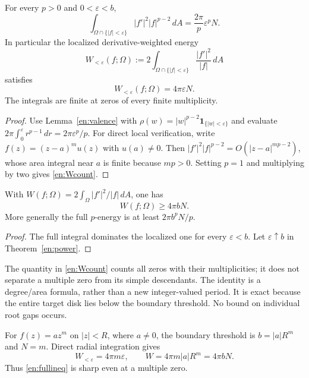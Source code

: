 \begin{theorem}\label{en:power}
For every $p>0$ and $0<\varepsilon<b$,
\begin{equation}\label{en:poweridentity}
 \int_{\Omega\cap\{|f|<\varepsilon\}}
       |f'|^2|f|^{p-2}\,dA
 =\frac{2\pi}{p}\varepsilon^p N.
\end{equation}
In particular the localized derivative-weighted energy
\begin{equation}\label{en:Wdef}
 W_{<\varepsilon}(f;\Omega)
 :=2\int_{\Omega\cap\{|f|<\varepsilon\}}
                 \frac{|f'|^2}{|f|}\,dA
\end{equation}
satisfies
\begin{equation}\label{en:Wcount}
 \boxed{W_{<\varepsilon}(f;\Omega)=4\pi\varepsilon N.}
\end{equation}
The integrals are finite at zeros of every finite multiplicity.
\end{theorem}
\begin{proof}
Use Lemma~\ref{en:valence} with
$\rho(w)=|w|^{p-2}\mathbf1_{\{|w|<\varepsilon\}}$ and evaluate
$2\pi\int_0^\varepsilon r^{p-1}\,dr=2\pi\varepsilon^p/p$.
For direct local verification, write $f(z)=(z-a)^m u(z)$ with $u(a)\ne0$.
Then $|f'|^2|f|^{p-2}=O(|z-a|^{mp-2})$, whose area integral near $a$
is finite because $mp>0$. Setting $p=1$ and multiplying by two gives
\eqref{en:Wcount}.
\end{proof}

\begin{corollary}\label{en:fullbound}
With
$W(f;\Omega)=2\int_\Omega |f'|^2/|f|\,dA$, one has
\begin{equation}\label{en:fullineq}
 W(f;\Omega)\ge4\pi bN.
\end{equation}
More generally the full $p$-energy is at least
$2\pi b^pN/p$.
\end{corollary}
\begin{proof}
The full integral dominates the localized one for every $\varepsilon<b$.
Let $\varepsilon\uparrow b$ in Theorem~\ref{en:power}.
\end{proof}

The quantity in \eqref{en:Wcount} counts all zeros with their
multiplicities; it does not separate a multiple zero from its simple
descendants. The identity is a degree/area formula, rather than a new
integer-valued period. It is exact because the entire target disk lies
below the boundary threshold. No bound on individual root gaps occurs.

\begin{example}\label{en:monomial}
For $f(z)=az^m$ on $|z|<R$, where $a\ne0$, the boundary threshold is
$b=|a|R^m$ and $N=m$. Direct radial integration gives
\[
 W_{<\varepsilon}=4\pi m\varepsilon,\qquad
 W=4\pi m|a|R^m=4\pi bN.
\]
Thus \eqref{en:fullineq} is sharp even at a multiple zero.
\end{example}

